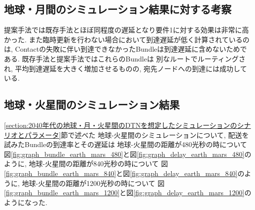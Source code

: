 
\subsection{地球・月間のシミュレーション結果に対する考察}
\label{section:地球・月間のシミュレーション結果に対する考察}
提案手法では既存手法とほぼ同程度の遅延となり要件1に対する効果は非常に高かった. 
また臨時更新を行わない場合において到達遅延が低く計算されているのは, 
Contactの失敗に伴い到達できなかったBundleは到達遅延に含めないためである. 既存手法と提案手法ではこれらのBundleは
別なルートでルーティングされ, 平均到達遅延を大きく増加させるものの, 宛先ノードへの到達には成功している. 

\subsection{地球・火星間のシミュレーション結果}
\label{section:地球・火星間のシミュレーション結果}
\ref{section:2040年代の地球・月・火星間のDTNを想定したシミュレーションのシナリオとパラメータ}節で述べた
地球-火星間のシミュレーションについて, 配送を試みたBundleの到達率とその遅延は
地球-火星間の距離が480光秒の時について
図\ref{fig:graph_bundle_earth_mars_480}と図\ref{fig:graph_delay_earth_mars_480}のように, 
地球-火星間の距離が840光秒の時について
図\ref{fig:graph_bundle_earth_mars_840}と図\ref{fig:graph_delay_earth_mars_840}のように, 
地球-火星間の距離が1200光秒の時について
図\ref{fig:graph_bundle_earth_mars_1200}と図\ref{fig:graph_delay_earth_mars_1200}のようになった. 

